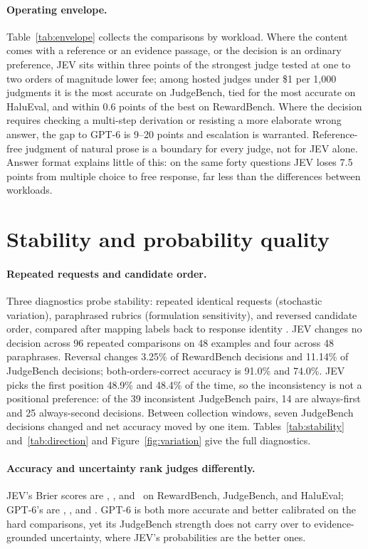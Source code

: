 \documentclass[11pt]{article}
\begin{document}
\paragraph{Operating envelope.}
Table~\ref{tab:envelope} collects the comparisons by workload. Where the content comes with a reference or an evidence passage, or the decision is an ordinary preference, JEV sits within three points of the strongest judge tested at one to two orders of magnitude lower fee; among hosted judges under \$1 per 1,000 judgments it is the most accurate on JudgeBench, tied for the most accurate on HaluEval, and within 0.6 points of the best on RewardBench. Where the decision requires checking a multi-step derivation or resisting a more elaborate wrong answer, the gap to GPT-6 is 9--20 points and escalation is warranted. Reference-free judgment of natural prose is a boundary for every judge, not for JEV alone. Answer format explains little of this: on the same forty questions JEV loses 7.5 points from multiple choice to free response, far less than the differences between workloads.

\section{Stability and probability quality}
\label{sec:stability}
\paragraph{Repeated requests and candidate order.}
Three diagnostics probe stability: repeated identical requests (stochastic variation), paraphrased rubrics (formulation sensitivity), and reversed candidate order, compared after mapping labels back to response identity \citep{zheng2023,rubrics}. JEV changes no decision across 96 repeated comparisons on 48 examples and four across 48 paraphrases. Reversal changes 3.25\% of RewardBench decisions and 11.14\% of JudgeBench decisions; both-orders-correct accuracy is 91.0\% and 74.0\%. JEV picks the first position 48.9\% and 48.4\% of the time, so the inconsistency is not a positional preference: of the 39 inconsistent JudgeBench pairs, 14 are always-first and 25 always-second decisions. Between collection windows, seven JudgeBench decisions changed and net accuracy moved by one item. Tables~\ref{tab:stability} and~\ref{tab:direction} and Figure~\ref{fig:variation} give the full diagnostics.

\paragraph{Accuracy and uncertainty rank judges differently.}
JEV's Brier scores are \expJevRBBrier, \expJevJBBrier, and \expJevHABrier\ on RewardBench, JudgeBench, and HaluEval; GPT-6's are \expGptSixRBBrier, \expGptSixJBBrier, and \expGptSixHABrier. GPT-6 is both more accurate and better calibrated on the hard comparisons, yet its JudgeBench strength does not carry over to evidence-grounded uncertainty, where JEV's probabilities are the better ones.
\end{document}
